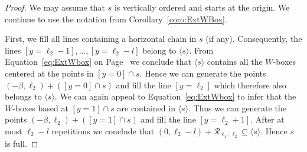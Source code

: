 \documentclass[11pt]{article}
\theoremstyle{definition}
\numberwithin{equation}{section}
\newcommand{\CR}{{\mathcal R}}
\newcommand{\xb}{\beta}
\newcommand{\cl}{s}
\newcommand{\Rect}{\CR}
\newcommand{\nl}{{l}}
\begin{document}
\begin{proof}
We may assume that $\cl$ is vertically ordered and 
starts at the origin. We continue to use the notation from
Corollary~\ref{coro:ExtWBox}.

First, we fill all lines containing a horizontal chain in $\cl$
(if any). Consequently, the lines $[y=\ell_2-1],\ldots,[y=\ell_2-\nl ]$ 
belong to $\langle\cl\rangle$. From 
Equation~\eqref{eq:ExtWbox} on Page~\pageref{eq:ExtWbox}
we conclude that $\langle\cl\rangle$ contains all the $W$-boxes 
centered at the points in $[y=0]\cap\cl$. 
Hence we can generate the points $(-\xb,\ell_2)+([y=0]\cap\cl)$ 
and fill the line $[y=\ell_2]$ which therefore also belongs
to $\langle\cl\rangle$. We can again appeal to 
Equation~\eqref{eq:ExtWbox} to infer that the $W$-boxes based at
$[y=1]\cap\cl$ are contained in $\langle\cl\rangle$. Thus
we can generate the points $(-\xb,\ell_2)+([y=1]\cap\cl)$ 
and fill the line $[y=\ell_2+1]$. After at most $\ell_2-\nl$ 
repetitions we conclude that $(0,\ell_2-\nl)+\Rect_{\ell_1,\ell_2}
\subseteq\langle\cl\rangle$. Hence $\cl$ is full. 
\end{proof}
 
\end{document}

